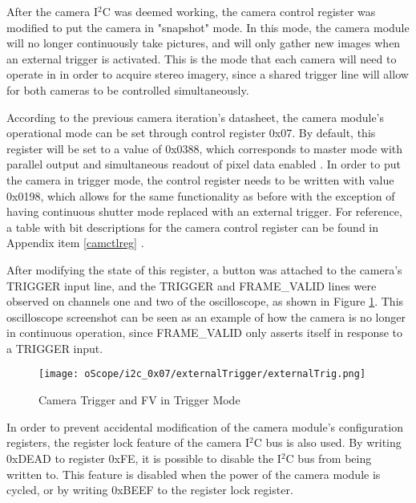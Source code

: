 \par
After the camera I$^2$C was deemed working, the camera control register was modified to put the camera in "snapshot" mode. In this mode, the camera module will no longer continuously take pictures, and will only gather new images when an external trigger is activated. This is the mode that each camera will need to operate in in order to acquire stereo imagery, since a shared trigger line will allow for both cameras to be controlled simultaneously.
\par
According to the previous camera iteration's datasheet, the camera module's operational mode can be set through control register 0x07. By default, this register will be set to a value of 0x0388, which corresponds to master mode with parallel output and simultaneous readout of pixel data enabled \cite{mt9v032}. In order to put the camera in trigger mode, the control register needs to be written with value 0x0198, which allows for the same functionality as before with the exception of having continuous shutter mode replaced with an external trigger. For reference, a table with bit descriptions for the camera control register can be found in Appendix item \ref{camctlreg} \cite{mt9v032}.
\par
After modifying the state of this register, a button was attached to the camera's TRIGGER input line, and the TRIGGER and FRAME\_VALID lines were observed on channels one and two of the oscilloscope, as shown in Figure \ref{camInTrigMode}. This oscilloscope screenshot can be seen as an example of how the camera is no longer in continuous operation, since FRAME\_VALID only asserts itself in response to a TRIGGER input. 
\begin{figure}[H]
	\centerline{\texttt{[image: oScope/i2c\_0x07/externalTrigger/externalTrig.png]}}
	\caption{Camera Trigger and FV in Trigger Mode}
	\label{camInTrigMode}
\end{figure}
\par
In order to prevent accidental modification of the camera module's configuration registers, the register lock feature of the camera I$^2$C bus is also used. By writing 0xDEAD to register 0xFE, it is possible to disable the I$^2$C bus from being written to. This feature is disabled when the power of the camera module is cycled, or by writing 0xBEEF to the register lock register.
